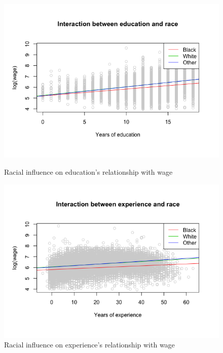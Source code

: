 \documentclass{article}
\begin{document}
      \begin{figure}
        \centering
        \begin{minipage}{.45\textwidth}
          \centering
          \includegraphics[scale=0.35]{interaction/edurace}
          \caption{Racial influence on education's relationship with wage}
          \label{fig:interactionedurace}

          \includegraphics[scale=0.35]{interaction/exprace}
          \caption{Racial influence on experience's relationship with wage}
          \label{fig:interationexprace}


\end{minipage}
\end{figure}
\end{document}
